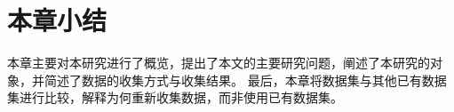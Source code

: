 


\section{本章小结}

本章主要对本研究进行了概览，提出了本文的主要研究问题，阐述了本研究的对象，并简述了数据的收集方式与收集结果。
最后，本章将数据集与其他已有数据集进行比较，解释为何重新收集数据，而非使用已有数据集。
